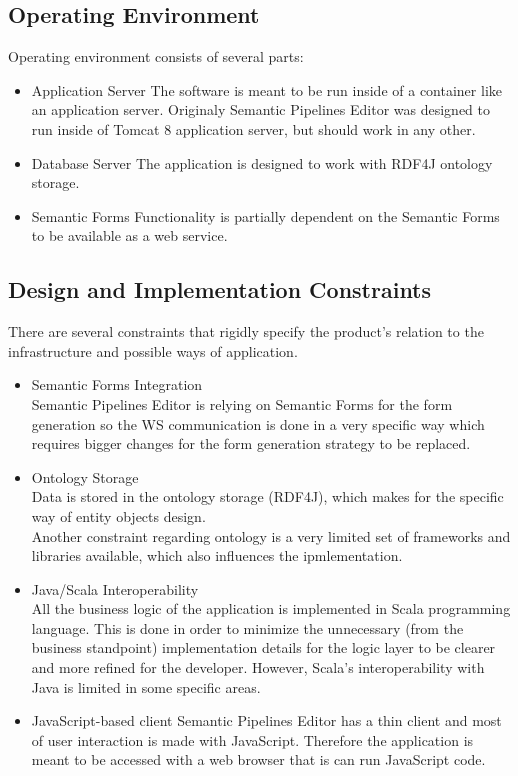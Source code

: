 \documentclass{article}
\begin{document}
\subsection{Operating Environment}
Operating environment consists of several parts:
\begin{itemize}
    \item Application Server
	The software is meant to be run inside of a container like an application server. Originaly Semantic Pipelines Editor was designed to run inside of Tomcat 8 application server, but should work in any other.
    \item Database Server
	The application is designed to work with RDF4J ontology storage.
    \item Semantic Forms
	Functionality is partially dependent on the Semantic Forms to be available as a web service.
\end{itemize}
\subsection{Design and Implementation Constraints}
There are several constraints that rigidly specify the product's relation to the infrastructure and possible ways of application.
\begin{itemize}
    \item Semantic Forms Integration\\
    Semantic Pipelines Editor is relying on Semantic Forms for the form generation so the WS communication is done in a very specific way which requires bigger changes for the form generation strategy to be replaced.
    \item Ontology Storage\\
    Data is stored in the ontology storage (RDF4J), which makes for the specific way of entity objects design.\\
    Another constraint regarding ontology is a very limited set of frameworks and libraries available, which also influences the ipmlementation.
    \item Java/Scala Interoperability\\
    All the business logic of the application is implemented in Scala programming language. This is done in order to minimize the unnecessary (from the business standpoint) implementation details for the logic layer to be clearer and more refined for the developer. However, Scala's interoperability with Java is limited in some specific areas.\\
    \item JavaScript-based client
    Semantic Pipelines Editor has a thin client and most of user interaction is made with JavaScript. Therefore the application is meant to be accessed with a web browser that is can run JavaScript code.
\end{itemize}
\end{document}
